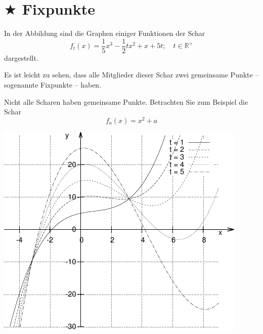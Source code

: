 \documentclass[11pt,a4paper,twoside,fleqn]{article}
\begin{document}
\noindent\begin{minipage}[b]{0.49\linewidth}
\section{$\bigstar$ Fixpunkte}
In der Abbildung sind die Graphen einiger Funktionen der Schar
$$f_t(x)=\frac 1 5 x^3 -\frac 1 2 tx^2 +x+5t;\quad t\in\mathbb{R}^+$$
dargestellt.

Es ist leicht zu sehen, dass alle Mitglieder dieser Schar zwei
gemeinsame Punkte -- sogenannte Fixpunkte --  haben.

Nicht alle Scharen haben gemeinsame Punkte. Betrachten Sie zum
Beispiel die Schar 
$$f_a(x)=x^2+a$$


\end{minipage}
\hfill
\begin{minipage}[b]{0.5\linewidth}
  \includegraphics[width=1\linewidth]{pics/graph_3}
\end{minipage}
\end{document}
